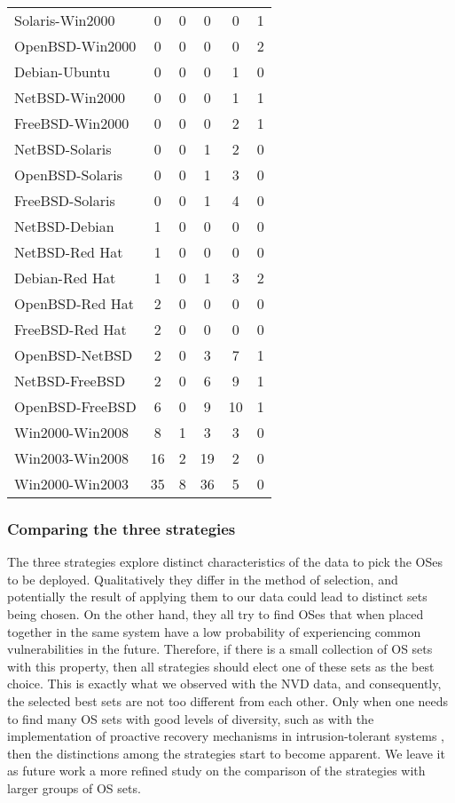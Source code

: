 \begin{table}[!ht]
\begin{center}
{\begin{tabular}{|l||c c c c c|}
Solaris-Win2000 & 0 & 0 & 0 & 0 & 1  \\
OpenBSD-Win2000 & 0 & 0 & 0 & 0 & 2 \\ \hline
Debian-Ubuntu & 0 & 0 & 0 & 1 & 0 \\
NetBSD-Win2000 & 0 & 0 & 0 & 1 & 1 \\
FreeBSD-Win2000 & 0 & 0 & 0 & 2 & 1 \\ \hline
NetBSD-Solaris & 0 & 0 & 1 & 2 & 0 \\
OpenBSD-Solaris & 0 & 0 & 1 & 3 & 0 \\
FreeBSD-Solaris & 0 & 0 & 1 & 4 & 0 \\ \hline
NetBSD-Debian & 1 & 0 & 0 & 0 & 0  \\
NetBSD-Red Hat & 1 & 0 & 0 & 0 & 0 \\
Debian-Red Hat & 1 & 0 & 1 & 3 & 2 \\
OpenBSD-Red Hat & 2 & 0 & 0 & 0 & 0 \\
FreeBSD-Red Hat & 2 & 0 & 0 & 0 & 0 \\
OpenBSD-NetBSD & 2 & 0 & 3 & 7 & 1 \\
NetBSD-FreeBSD & 2 & 0 & 6 & 9 & 1 \\
OpenBSD-FreeBSD & 6 & 0 & 9 & 10 &  1\\
Win2000-Win2008 & 8 & 1 & 3 & 3 & 0 \\
Win2003-Win2008 & 16 & 2 & 19 & 2 & 0 \\
Win2000-Win2003 & 35 & 8 & 36 & 5 & 0\\ \hline
\end{tabular}
}
\end{center}
\end{table}

\subsubsection*{Comparing the three strategies}
The three strategies explore distinct characteristics of the data to pick the OSes to be deployed. Qualitatively they differ in the method of selection, and potentially the result of applying them to our data could lead to distinct sets being chosen. On the other hand, they all try to find OSes that when placed together in the same system have a low probability of experiencing common vulnerabilities in the future. Therefore, if there is a small collection of OS sets with this property, then all strategies should elect one of these sets as the best choice. This is exactly what we observed with the NVD data, and consequently, the selected best sets are not too different from each other.
Only when one needs to find many OS sets with good levels of diversity, such as with the implementation of proactive recovery mechanisms in intrusion-tolerant systems \cite{Cas02,sousa:pc}, then the distinctions among the strategies start to become apparent.
We leave it as future work a more refined study on the comparison of the strategies with larger groups of OS sets.

